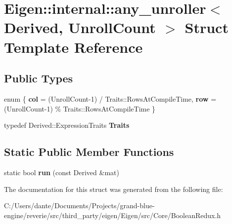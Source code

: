 \hypertarget{struct_eigen_1_1internal_1_1any__unroller}{}\section{Eigen\+::internal\+::any\+\_\+unroller$<$ Derived, Unroll\+Count $>$ Struct Template Reference}
\label{struct_eigen_1_1internal_1_1any__unroller}
\subsection*{Public Types}
\begin{DoxyCompactItemize}
\item 
\mbox{\label{struct_eigen_1_1internal_1_1any__unroller_a90cdc7bddbf9e655e2cfebd6ceb95956}} 
enum \{ {\bfseries col} = (Unroll\+Count-\/1) / Traits\+::Rows\+At\+Compile\+Time, 
{\bfseries row} = (Unroll\+Count-\/1) \% Traits\+::Rows\+At\+Compile\+Time
 \}
\item 
\mbox{\label{struct_eigen_1_1internal_1_1any__unroller_a16eb27338e753255e5f97dda309b8aa9}} 
typedef Derived\+::\+Expression\+Traits {\bfseries Traits}
\end{DoxyCompactItemize}
\subsection*{Static Public Member Functions}
\begin{DoxyCompactItemize}
\item 
\mbox{\label{struct_eigen_1_1internal_1_1any__unroller_a706f0aae20ca7a0633921d3219e12ca7}} 
static bool {\bfseries run} (const Derived \&mat)
\end{DoxyCompactItemize}


The documentation for this struct was generated from the following file\+:\begin{DoxyCompactItemize}
\item 
C\+:/\+Users/dante/\+Documents/\+Projects/grand-\/blue-\/engine/reverie/src/third\+\_\+party/eigen/\+Eigen/src/\+Core/Boolean\+Redux.\+h\end{DoxyCompactItemize}
